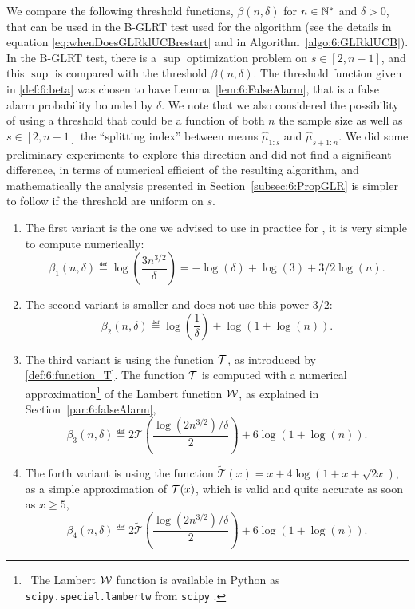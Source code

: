 %

We compare the following threshold functions, $\beta(n,\delta)$ for $n\in\mathbb{N}^*$ and $\delta>0$, that can be used in the B-GLRT test used for the \GLRklUCB{} algorithm (see the details in equation \eqref{eq:whenDoesGLRklUCBrestart} and in Algorithm~\ref{algo:6:GLRklUCB}).
%
In the B-GLRT test, there is a $\sup$ optimization problem on $s\in[2,n-1]$, and this $\sup$ is compared with the threshold $\beta(n,\delta)$. The threshold function given in \eqref{def:6:beta} was chosen to have Lemma~\ref{lem:6:FalseAlarm}, that is a false alarm probability bounded by $\delta$.
%
We note that we also considered the possibility of using a threshold that could be a function of both $n$ the sample size as well as $s\in[2,n-1]$ the ``splitting index'' between means $\widehat{\mu}_{1:s}$ and $\widehat{\mu}_{s+1:n}$.
We did some preliminary experiments to explore this direction and did not find a significant difference, in terms of numerical efficient of the resulting \GLRklUCB{} algorithm, and mathematically the analysis presented in Section~\ref{subsec:6:PropGLR} is simpler to follow if the threshold are uniform on $s$.

\begin{enumerate}%
    \item
    The first variant is the one we advised to use in practice for \GLRklUCB,
    it is very simple to compute numerically:
    \[ \beta_1(n, \delta) \eqdef \log\left(\frac{3 n^{3/2}}{\delta}\right) = -\log(\delta) + \log(3) + 3/2 \log(n). \]

    \item
    The second variant is smaller and does not use this power $3/2$:
    \[ \beta_2(n, \delta) \eqdef \log\left(\frac{1}{\delta}\right) + \log(1 + \log(n)). \]

    \item
    The third variant is using the function $\mathcal{T}$, as introduced by \eqref{def:6:function_T}.
    The function $\mathcal{T}$ is computed with a numerical approximation\footnote{~The Lambert $\mathcal{W}$ function is available in Python as \texttt{scipy.special.lambertw} from \texttt{scipy} \cite{scipy}.} of the Lambert function $\mathcal{W}$, as explained in Section~\ref{par:6:falseAlarm},
    \[ \beta_3(n, \delta) \eqdef 2 \mathcal{T}\left(\frac{\log(2 n^{3/2}) / \delta}{2}\right) + 6 \log(1 + \log(n)). \]

    \item
    The forth variant is using the function $\widetilde{\mathcal{T}}(x) = x + 4 \log(1 + x + \sqrt{2x})$, as a simple approximation of $\mathcal{T}(x)$, which is valid and quite accurate as soon as $x \geq 5$,
    \[ \beta_4(n, \delta) \eqdef 2 \widetilde{\mathcal{T}}\left(\frac{\log(2 n^{3/2}) / \delta}{2}\right) + 6 \log(1 + \log(n)). \]
\end{enumerate}

